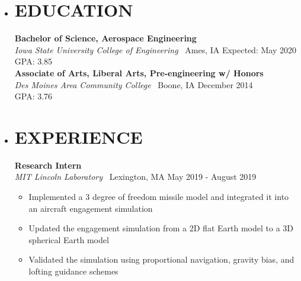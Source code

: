 \documentclass[overlapped, 11pt]{res}
\begin{document}
\address
{
    4329 Lincoln Swing \#36 Ames, IA 50014 
    \textbar \ (641) 780-9473 
    \textbar \ carldevries@gmail.com 
}

\begin{resume}

    \begin{itemize}
    
        \item[]\section{EDUCATION}
            \textbf{Bachelor of Science, Aerospace Engineering} \\
            \emph{Iowa State University College of Engineering} \textbar 
                \ Ames, IA \hfill Expected: May 2020\\
                GPA: 3.85
            \\[0.5em]
            \textbf{Associate of Arts, Liberal Arts, Pre-engineering w/ Honors} \\
            \emph{Des Moines Area Community College} \textbar 
                \ Boone, IA \hfill December 2014\\
                GPA: 3.76

        \item[]\section{EXPERIENCE}
            \textbf{Research Intern}\\
            \emph{MIT Lincoln Laboratory} \textbar 
                \ Lexington, MA \hfill May 2019 - August 2019
            \begin{itemize}
                \item Implemented a 3 degree of freedom missile model and integrated it into an aircraft engagement simulation
                \item Updated the engagement simulation from a 2D flat Earth model to a 3D spherical Earth model
                \item Validated the simulation using proportional navigation, gravity bias, and lofting guidance schemes
           \end{itemize}
            

\end{itemize}
\end{resume}
\end{document}
